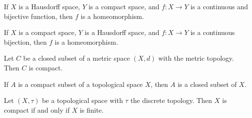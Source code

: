 	\item If $X$ is a Hausdorff space, $Y$ is a compact space, and $f : X \to Y$ is a continuous and bijective function, then $f$ is a homeomorphism. 
	
	\item If $X$ is a compact space, $Y$ is a Hausdorff space, and $f : X \to Y$ is a continuous bijection, then $f$ is a homeomorphism. 
	
	\item Let $C$ be a closed subset of a metric space $(X, d)$ with the metric topology. Then $C$ is compact.
	
	\item If $A$ is a compact subset of a topological space $X$, then $A$ is a closed subset of $X$.
	
	\item Let $(X,\tau)$ be a topological space with $\tau$ the discrete topology. Then $X$ is compact if and only if $X$ is finite. 
	
		
	\ea

